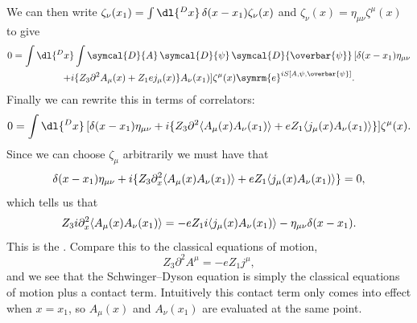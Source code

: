 \documentclass[fleqn]{NotesClass}
\newcommand{\e}{\symrm{e}}
\newcommand{\diracadjoint}[1]{\overbar{#1}}
\newcommand{\DL}[1]{\symcal{D}{#1}}
\newcommand{\DD}[1]{\,\symcal{D}{#1}}
\DeclarePairedDelimiter{\correlator}{\langle}{\rangle}
\newcommand{\dalembertian}{\partial^2}
\newcommand{\minkowskiMetric}{\eta}
\begin{document}
    We can then write \(\zeta_\nu(x_1) = \int \dl{^Dx} \, \delta(x - x_1)\zeta_\nu(x)\) and \(\zeta_\nu(x) = \minkowskiMetric_{\mu\nu}\zeta^\mu(x)\) to give
    \begin{multline}
        0 = \int \dl{^Dx} \int \DL{A} \DD{\psi} \DD{\diracadjoint{\psi}} \, [ \delta(x - x_1) \minkowskiMetric_{\mu\nu}\\
        + i\{Z_3 \dalembertian A_\mu(x) + Z_1 ej_\mu(x)\}A_\nu(x_1) ]\zeta^\mu(x) \e^{iS[A, \psi, \diracadjoint{\psi}]}.
    \end{multline}
    Finally we can rewrite this in terms of correlators:
    \begin{equation}
        0 = \int \dl{^Dx} \, [\delta(x - x_1) \minkowskiMetric_{\mu\nu} + i\{Z_3\dalembertian \correlator{A_\mu(x)A_\nu(x_1)} + eZ_1\correlator{j_\mu(x)A_\nu(x_1)}\}]\zeta^\mu(x).
    \end{equation}
    Since we can choose \(\zeta_\mu\) arbitrarily we must have that
    \begin{equation}
        \delta(x - x_1)\minkowskiMetric_{\mu\nu} + i\{Z_3\dalembertian_x \correlator{A_\mu(x)A_\nu(x_1)} + eZ_1\correlator{j_\mu(x)A_\nu(x_1)}\} = 0,
    \end{equation}
    which tells us that
    \begin{equation}
        Z_3i\dalembertian_x\correlator{A_\mu(x)A_\nu(x_1)} = -eZ_1i\correlator{j_\mu(x)A_\nu(x_1)} - \minkowskiMetric_{\mu\nu}\delta(x - x_1).
    \end{equation}
    This is the .
    Compare this to the classical equations of motion,
    \begin{equation}
        Z_3\dalembertian A^\mu = -eZ_1j^\mu,
    \end{equation}
    and we see that the Schwinger--Dyson equation is simply the classical equations of motion plus a contact term.
    Intuitively this contact term only comes into effect when \(x = x_1\), so \(A_\mu(x)\) and \(A_\nu(x_1)\) are evaluated at the same point.
    
\end{document}
